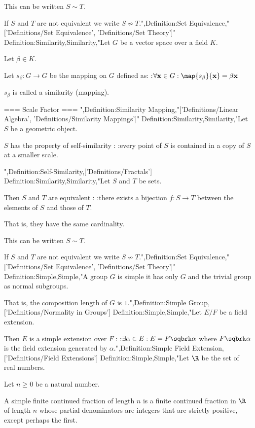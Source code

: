 This can be written $S \sim T$.


If $S$ and $T$ are not equivalent we write $S \nsim T$.",Definition:Set Equivalence,"['Definitions/Set Equivalence', 'Definitions/Set Theory']"
Definition:Similarity,Similarity,"Let $G$ be a vector space over a field $K$.

Let $\beta \in K$.

Let $s_\beta: G \to G$ be the mapping on $G$ defined as:
:$\forall \mathbf x \in G: \map {s_\beta} {\mathbf x} = \beta \mathbf x$


$s_\beta$ is called a similarity (mapping).


=== Scale Factor ===
",Definition:Similarity Mapping,"['Definitions/Linear Algebra', 'Definitions/Similarity Mappings']"
Definition:Similarity,Similarity,"Let $S$ be a geometric object.

$S$ has the property of self-similarity :
:every point of $S$ is contained in a copy of $S$ at a smaller scale.



",Definition:Self-Similarity,['Definitions/Fractals']
Definition:Similarity,Similarity,"Let $S$ and $T$ be sets.

Then $S$ and $T$ are equivalent :
:there exists a bijection $f: S \to T$ between the elements of $S$ and those of $T$.

That is,  they have the same cardinality.


This can be written $S \sim T$.


If $S$ and $T$ are not equivalent we write $S \nsim T$.",Definition:Set Equivalence,"['Definitions/Set Equivalence', 'Definitions/Set Theory']"
Definition:Simple,Simple,"A group $G$ is simple  it has only $G$ and the trivial group as normal subgroups.

That is,  the composition length of $G$ is $1$.",Definition:Simple Group,['Definitions/Normality in Groups']
Definition:Simple,Simple,"Let $E / F$ be a field extension.


Then $E$ is a simple extension over $F$ :
:$\exists \alpha \in E: E = F \sqbrk \alpha$
where $F \sqbrk \alpha$ is the field extension generated by $\alpha$.",Definition:Simple Field Extension,['Definitions/Field Extensions']
Definition:Simple,Simple,"Let $\R$ be the set of real numbers.

Let $n \ge 0$ be a natural number.


A simple finite continued fraction of length $n$ is a finite continued fraction in $\R$ of length $n$ whose partial denominators are integers that are strictly positive, except perhaps the first.

